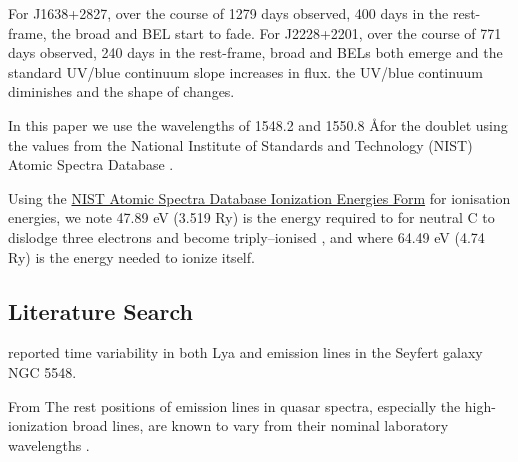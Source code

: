 \documentclass[a4paper,fleqn,usenatbib]{mnras}
\begin{document}
For J1638+2827, over the course of 1279 days observed, 400 days in the rest-frame, the  broad \civ and \ciii BEL start to fade.  
For J2228+2201, over the course of 771 days observed, 240 days in the rest-frame, broad \civ and \ciii BELs both emerge and the 
standard UV/blue continuum slope increases in flux. 
the UV/blue continuum diminishes and the shape of \lya changes. 

In this paper we use the wavelengths of 1548.2 and 1550.8 \AA for the \civ doublet
using the values from the National Institute of Standards and Technology (NIST) Atomic Spectra Database 
\citep{Kramida2018}. 

Using the \href{https://physics.nist.gov/PhysRefData/ASD/ionEnergy.html}{NIST Atomic Spectra Database Ionization Energies Form}
for ionisation energies, we note 47.89 eV  (3.519 Ry) is the energy required to for neutral C to dislodge three electrons and become triply--ionised \civ, 
and where 64.49 eV (4.74 Ry) is the energy needed to ionize \civ itself. 




\subsection{Literature Search}
\citet{Gregory1982} reported time variability in both Lya and  emission lines in the Seyfert galaxy NGC 5548.

From \citet{VandenBerk2001} 
The rest positions of emission lines in quasar spectra, especially the
high-ionization broad lines, are known to vary from their nominal
laboratory wavelengths \citep{Gaskell1982, Wilkes1986,  Espey1989, Espey1990Erratum, 
ZhengSulentic1990, Corbin1990, Weymann1991, TytlerFan1992, 
Brotherton1994, Laor1995, McIntosh1999}. 
\end{document}

